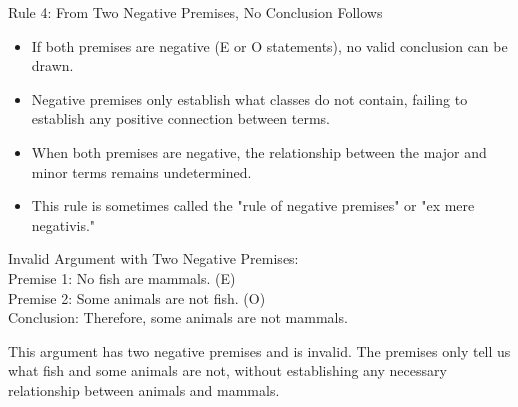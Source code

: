 \documentclass{beamer}
\begin{document}
	\begin{frame}{Rule 4: From Two Negative Premises, No Conclusion Follows}
		\begin{itemize}
			\item If both premises are negative (E or O statements), no valid conclusion can be drawn.
			\item Negative premises only establish what classes do not contain, failing to establish any positive connection between terms.
			\item When both premises are negative, the relationship between the major and minor terms remains undetermined.
			\item This rule is sometimes called the "rule of negative premises" or "ex mere negativis."
		\end{itemize}
		
		\begin{example}
			\scriptsize
			Invalid Argument with Two Negative Premises:\\
			Premise 1: No fish are mammals. (E)\\
			Premise 2: Some animals are not fish. (O)\\
			Conclusion: Therefore, some animals are not mammals.
			
			This argument has two negative premises and is invalid. The premises only tell us what fish and some animals are not, without establishing any necessary relationship between animals and mammals.
		\end{example}
	\end{frame}
	
\end{document}
